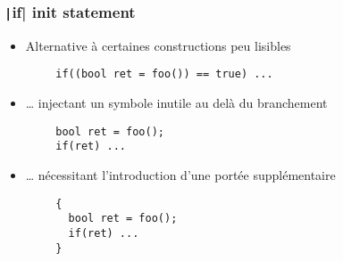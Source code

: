 \documentclass[C++.tex]{subfiles}
\begin{document}
\begin{frame}[fragile]
	\frametitle{\texttt|if| init statement}
	\begin{itemize}
		\item Alternative à certaines constructions peu lisibles
	\end{itemize}

	\begin{verbatim}
		if((bool ret = foo()) == true) ...
	\end{verbatim}

	\begin{itemize}
		\item \ldots{} injectant un symbole inutile au delà du branchement
	\end{itemize}

	\begin{verbatim}
		bool ret = foo();
		if(ret) ...
	\end{verbatim}

	\begin{itemize}
		\item \ldots{} nécessitant l'introduction d'une portée supplémentaire
	\end{itemize}

	\begin{verbatim}
		{
		  bool ret = foo();
		  if(ret) ...
		}
	\end{verbatim}


\end{frame}
\end{document}
